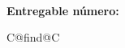 \begin{center}
  \begin{spacing}{2.5}
    \textbf{\Huge \DelTitle}\\\vspace{10mm}
    \textbf{\Large Entregable número: \DelNumber} \\\vspace{10mm}
  \end{spacing}

  \vspace*{\fill}

  \newcommand\undefcolumntype[1]{\expandafter\let\csname NC@find@#1\endcsname\relax}
  \newcommand\forcenewcolumntype[1]{\undefcolumntype{#1}\newcolumntype{#1}}
  \forcenewcolumntype{C}{ >{\arraybackslash} m{3cm} }


\end{center}

\clearpage

\setlength{\headheight}{1cm}
\setlength{\footskip}{18mm}
\addtolength{\textheight}{-\footskip}
\pagestyle{empty}

